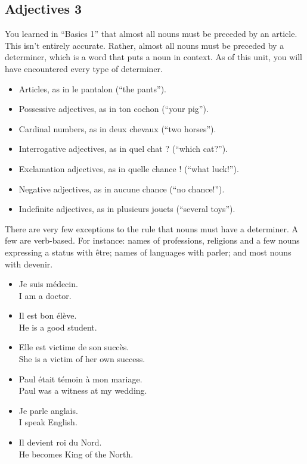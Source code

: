 \pagebreak
\subsection{Adjectives 3}

You learned in ``Basics 1'' that almost all nouns must be preceded by an article. This isn't entirely accurate. Rather, almost all nouns must be preceded by a determiner, which is a word that puts a noun in context. As of this unit, you will have encountered every type of determiner.

\begin{itemize}
  \item  Articles, as in le pantalon (``the pants'').
  \item  Possessive adjectives, as in ton cochon (``your pig'').
  \item  Cardinal numbers, as in deux chevaux (``two horses'').
  \item  Interrogative adjectives, as in quel chat ? (``which cat?'').
  \item  Exclamation adjectives, as in quelle chance ! (``what luck!'').
  \item  Negative adjectives, as in aucune chance (``no chance!'').
  \item  Indefinite adjectives, as in plusieurs jouets (``several toys'').
\end{itemize}

There are very few exceptions to the rule that nouns must have a determiner. A few are verb-based. For instance: names of professions, religions and a few nouns expressing a status with {\^e}tre; names of languages with parler; and most nouns with devenir.

\begin{itemize}
  \item  Je suis m{\'e}decin. \\ I am a doctor.
  \item  Il est bon {\'e}l{\`e}ve. \\ He is a good student.
  \item  Elle est victime de son succ{\`e}s. \\ She is a victim of her own success.
  \item  Paul {\'e}tait t{\'e}moin {\`a} mon mariage. \\ Paul was a witness at my wedding.
  \item  Je parle anglais. \\ I speak English.
  \item  Il devient roi du Nord. \\ He becomes King of the North.
\end{itemize}

